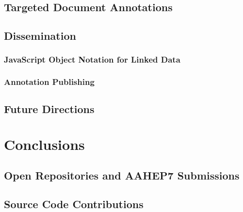 \documentclass[12pt,a4paper]{report}
\begin{document}
    \section{Targeted Document Annotations}
      \label{sec:notes}
      

    \clearpage

    \section{Dissemination}
      \label{sec:diss}
      

      \subsection{JavaScript Object Notation for Linked Data}
        \label{sec:json}
        

      \clearpage

      \subsection{Annotation Publishing}
        \label{sec:pub}
        

    \clearpage

    \section{Future Directions}
        \label{sec:future}
        

  \cleardoublepage

  \chapter{Conclusions}
    \label{sec:outro}
    

  \cleardoublepage

  
  

  \cleardoublepage

  \appendixpage
  \addappheadtotoc

  \cleardoublepage

  \appendix

    \renewcommand\thesection{\Alph{section}}

    \section{Open Repositories and AAHEP7 Submissions}
      \label{apx:or2014}
      

    \cleardoublepage

    \section{Source Code Contributions}
      \label{apx:code}
      

  
  
\end{document}
